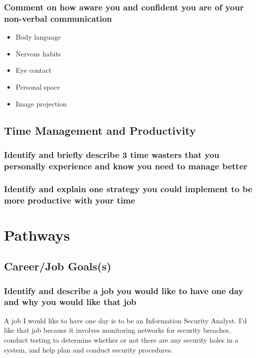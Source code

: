 \documentclass[11pt]{article}
\begin{document}
\subsubsection*{Comment on how aware you and confident you are of your non-verbal communication}
\label{sec:org1a04f1d}
\begin{itemize}
\item Body language
\label{sec:orgb2c6189}
\item Nervous habits
\label{sec:org8e403b1}
\item Eye contact
\label{sec:org37de989}
\item Personal space
\label{sec:orgadc63aa}
\item Image projection
\label{sec:org01098c7}
\end{itemize}
\subsection*{Time Management and Productivity}
\label{sec:org611f2c6}
\subsubsection*{Identify and briefly describe 3 time wasters that you personally experience and know you need to manage better}
\label{sec:org5bb63c5}
\subsubsection*{Identify and explain one strategy you could implement to be more productive with your time}
\label{sec:org87445dd}
\section*{Pathways}
\label{sec:org6605206}
\subsection*{Career/Job Goals(s)}
\label{sec:orge21c357}
\subsubsection*{Identify and describe a job you would like to have one day and why you would like that job}
\label{sec:org570fd3c}
A job I would like to have one day is to be an Information Security Analyst. I'd like that job because it involves monitoring networks for security breaches, conduct testing to determine whether or not there are any security holes in a system, and help plan and conduct security procedures.
\end{document}
